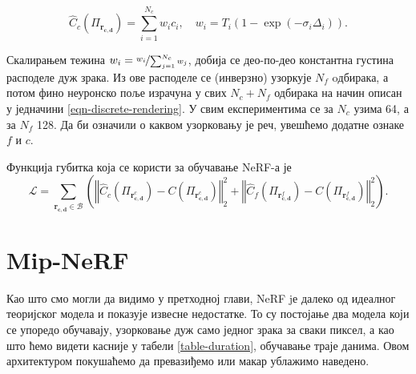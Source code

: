 \documentclass[12pt, a4paper, twoside]{book}
\numberwithin{equation}{chapter}
\numberwithin{theorem}{section}
\numberwithin{definition}{section}
\numberwithin{definitionChapter}{chapter}
\begin{document}
\begin{equation}
	\hat{C}_c(\Pi_{\mathbf{r_{c, d}}}) = \sum_{i=1}^{N_c}w_i c_i, \quad w_i = T_i (1- \exp(-\sigma_i\Delta_i)).
\end{equation}

Скалирањем тежина $w_i = \nicefrac{w_i}{\sum_{j=1}^{N_c}w_j}$, добија се део-по-део константна густина расподеле дуж зрака.
Из ове расподеле се (инверзно) узоркује $N_f$ oдбирака, а потом фино неуронско поље израчуна у свих
$N_c + N_f$ одбирака на начин описан у једначини \ref{eqn-discrete-rendering}. У свим експериментима се
за $N_c$ узима 64, а за $N_f$ 128. Да би означили о каквом узорковању је реч, увешћемо додатне ознаке
$f$ и $c$.

Функција губитка која се користи за обучавање NeRF-а је
\begin{equation}
	\mathcal{L} = \sum_{\mathbf{r_{c, d}} \in \mathcal{B}}
 	\left(
 	\left\Vert \hat{C}_c\left(\Pi_{\mathbf{r}^{c}_{\mathbf{c}, \mathbf{d}}}\right) -
 		C\left(\Pi_{\mathbf{r}^{c}_{\mathbf{c}, \mathbf{d}}}\right) \right\Vert^2_2 +
	\left\Vert \hat{C}_f\left(\Pi_{\mathbf{r}^{f}_{\mathbf{c}, \mathbf{d}}}\right) -
		C\left(\Pi_{\mathbf{r}^{f}_{\mathbf{c}, \mathbf{d}}}\right) \right\Vert^2_2
	\right).
	\label{eqn-nerf-loss}
\end{equation}

\section{Mip-NeRF}
Као што смо могли да видимо у претходној глави, NeRF jе далеко од идеалног теоријског модела и
показује извесне недостатке. То су постојање два модела који се упоредо обучавају, узорковање
дуж само једног зрака за сваки пиксел, а као што ћемо видети касније у табели \ref{table-duration},
обучавање траје данима. Овом архитектуром покушаћемо да превазиђемо или макар ублажимо наведено.
\end{document}
